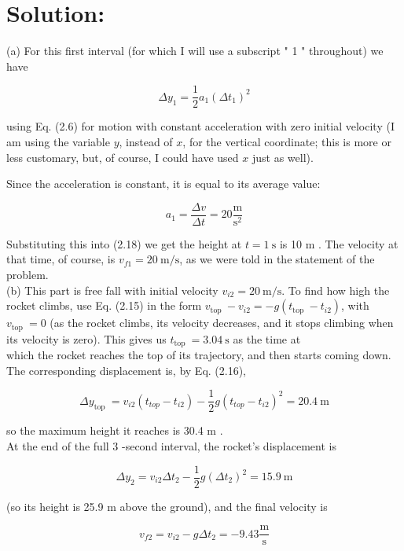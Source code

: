 \documentclass[10pt]{article}
\begin{document}
\section*{Solution:}
(a) For this first interval (for which I will use a subscript " 1 " throughout) we have


\begin{equation*}
\Delta y_{1}=\frac{1}{2} a_{1}\left(\Delta t_{1}\right)^{2} \tag{2.18}
\end{equation*}


using Eq. (2.6) for motion with constant acceleration with zero initial velocity (I am using the variable $y$, instead of $x$, for the vertical coordinate; this is more or less customary, but, of course, I could have used $x$ just as well).

Since the acceleration is constant, it is equal to its average value:

$$
a_{1}=\frac{\Delta v}{\Delta t}=20 \frac{\mathrm{m}}{\mathrm{s}^{2}}
$$

Substituting this into (2.18) we get the height at $t=1 \mathrm{~s}$ is 10 m . The velocity at that time, of course, is $v_{f 1}=20 \mathrm{~m} / \mathrm{s}$, as we were told in the statement of the problem.\\
(b) This part is free fall with initial velocity $v_{i 2}=20 \mathrm{~m} / \mathrm{s}$. To find how high the rocket climbs, use Eq. (2.15) in the form $v_{\text {top }}-v_{i 2}=-g\left(t_{\text {top }}-t_{i 2}\right)$, with $v_{\text {top }}=0$ (as the rocket climbs, its velocity decreases, and it stops climbing when its velocity is zero). This gives us $t_{\text {top }}=3.04 \mathrm{~s}$ as the time at\\
which the rocket reaches the top of its trajectory, and then starts coming down. The corresponding displacement is, by Eq. (2.16),

$$
\Delta y_{\text {top }}=v_{i 2}\left(t_{t o p}-t_{i 2}\right)-\frac{1}{2} g\left(t_{t o p}-t_{i 2}\right)^{2}=20.4 \mathrm{~m}
$$

so the maximum height it reaches is 30.4 m .\\
At the end of the full 3 -second interval, the rocket's displacement is

$$
\Delta y_{2}=v_{i 2} \Delta t_{2}-\frac{1}{2} g\left(\Delta t_{2}\right)^{2}=15.9 \mathrm{~m}
$$

(so its height is 25.9 m above the ground), and the final velocity is

$$
v_{f 2}=v_{i 2}-g \Delta t_{2}=-9.43 \frac{\mathrm{m}}{\mathrm{s}}
$$
\end{document}
